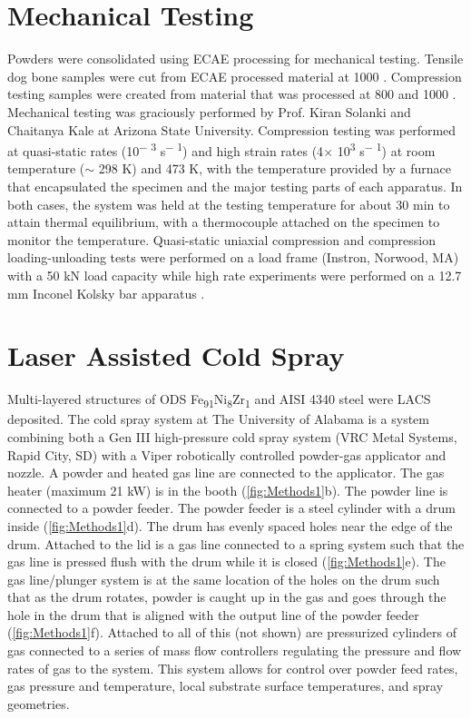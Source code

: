 \section*{Mechanical Testing}

	
	
	Powders were consolidated using ECAE processing for mechanical testing. Tensile dog bone samples were cut from ECAE processed material at 1000 \celsius{}. Compression testing samples were created from material that was processed at 800 \celsius{} and 1000 \celsius{}. Mechanical testing was graciously performed by Prof. Kiran Solanki and Chaitanya Kale at Arizona State University. Compression testing was performed at quasi-static rates (10\textsuperscript{$-$ 3} s\textsuperscript{$-$ 1}) and high strain rates (4$ \times$ 10\textsuperscript{3} s\textsuperscript{$-$ 1}) at room temperature ($ \sim $ 298 K) and 473 K, with the temperature provided by a furnace that encapsulated the specimen and the major testing parts of each apparatus. In both cases, the system was held at the testing temperature for about 30 min to attain thermal equilibrium, with a thermocouple attached on the specimen to monitor the temperature. Quasi-static uniaxial compression and compression loading-unloading tests were performed on a load frame (Instron, Norwood, MA) with a 50 kN load capacity while high rate experiments were performed on a 12.7 mm Inconel Kolsky bar apparatus \cite{RN1012,RN1053}. 



\section*{Laser Assisted Cold Spray}


	
	Multi-layered structures of ODS Fe\textsubscript{91}Ni\textsubscript{8}Zr\textsubscript{1 }and AISI 4340 steel were LACS deposited. The cold spray system at The University of Alabama is a system combining both a Gen III high-pressure cold spray system (VRC Metal Systems, Rapid City, SD) with a Viper robotically controlled powder-gas applicator and nozzle. A powder and heated gas line are connected to the applicator. The gas heater (maximum 21 kW) is in the booth (\ref{fig:Methods1}b). The powder line is connected to a powder feeder. The powder feeder is a steel cylinder with a drum inside (\ref{fig:Methods1}d). The drum has evenly spaced holes near the edge of the drum. Attached to the lid is a gas line connected to a spring system such that the gas line is pressed flush with the drum while it is closed (\ref{fig:Methods1}e). The gas line/plunger system is at the same location of the holes on the drum such that as the drum rotates, powder is caught up in the gas and goes through the hole in the drum that is aligned with the output line of the powder feeder (\ref{fig:Methods1}f). Attached to all of this (not shown) are pressurized cylinders of gas connected to a series of mass flow controllers regulating the pressure and flow rates of gas to the system. This system allows for control over powder feed rates, gas pressure and temperature, local substrate surface temperatures, and spray geometries.
	

